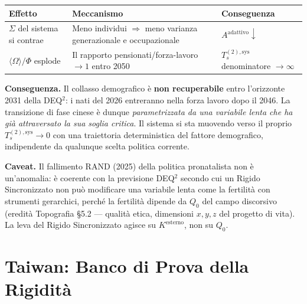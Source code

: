 {\def\LTcaptype{none} %
{\small\begin{longtable}[]{@{}
  >{\raggedright\arraybackslash}p{}
  >{\raggedright\arraybackslash}p{}
  >{\raggedright\arraybackslash}p{}@{}}
\toprule\noalign{}
\begin{minipage}[b]{\linewidth}\raggedright
Effetto
\end{minipage} & \begin{minipage}[b]{\linewidth}\raggedright
Meccanismo
\end{minipage} & \begin{minipage}[b]{\linewidth}\raggedright
Conseguenza
\end{minipage} \\
\midrule\noalign{}
\endhead
\bottomrule\noalign{}
\endlastfoot
\(\Sigma\) del sistema si contrae & Meno individui \(\Rightarrow\) meno
varianza generazionale e occupazionale &
\(A^{\text{adattivo}} \downarrow\) \\
\(\langle\Omega\rangle / \Phi\) esplode & Il rapporto
pensionati/forza-lavoro \(\to 1\) entro 2050 & \(T_s^{(2),\text{sys}}\)
denominatore \(\to \infty\) \\
\end{longtable}}
}

\Proved{} \textbf{Conseguenza.} Il collasso demografico è \textbf{non
recuperabile} entro l'orizzonte 2031 della DEQ$^2$: i nati del 2026
entreranno nella forza lavoro dopo il 2046. La transizione di fase
cinese è dunque \emph{parametrizzata da una variabile lenta che ha già
attraversato la sua soglia critica}. Il sistema si sta muovendo verso il
proprio \(T_s^{(2),\text{sys}} \to 0\) con una traiettoria
deterministica del fattore demografico, indipendente da qualunque scelta
politica corrente.

\Conj{} \textbf{Caveat.} Il fallimento RAND (2025) della politica
pronatalista non è un'anomalia: è coerente con la previsione DEQ$^2$
secondo cui un Rigido Sincronizzato non può modificare una variabile
lenta come la fertilità con strumenti gerarchici, perché la fertilità
dipende da \(Q_0\) del campo discorsivo (eredità Topografia \S{}5.2 ---
qualità etica, dimensioni \(x, y, z\) del progetto di vita). La leva del
Rigido Sincronizzato agisce su \(K^{\text{esterno}}\), non su \(Q_0\).



\section{Taiwan: Banco di Prova della
Rigidità}\label{taiwan-banco-di-prova-della-rigidituxe0}

